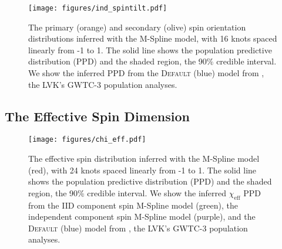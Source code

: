 \begin{figure}
    \begin{centering}
        \texttt{[image: figures/ind\_spintilt.pdf]}
        \caption{The primary (orange) and secondary (olive) spin orientation distributions inferred with the M-Spline model, 
        with 16 knots spaced linearly from -1 to 1. The solid line shows the population predictive distribution (PPD) and the shaded region, the 90\% credible interval. 
        We show the inferred PPD from the \textsc{Default} (blue) model from \citet{o3b_astro_dist}, the LVK's GWTC-3 population analyses.}
        \label{fig:ind_spintilt_dist}
    \end{centering}
\end{figure}

\subsection{The Effective Spin Dimension}

\begin{figure} 
    \begin{centering}
        \texttt{[image: figures/chi\_eff.pdf]}
        \caption{The effective spin distribution inferred with the M-Spline model (red), with 24 knots spaced linearly from -1 to 1. 
        The solid line shows the population predictive distribution (PPD) and the shaded region, the 90\% credible interval. We show the inferred $\chi_\mathrm{eff}$ 
        PPD from the IID component spin M-Spline model (green), the independent component spin M-Spline model (purple), 
        and the \textsc{Default} (blue) model from \citet{o3b_astro_dist}, the LVK's GWTC-3 population analyses.}
        \label{fig:chieff_dist}
    \end{centering}
\end{figure}

